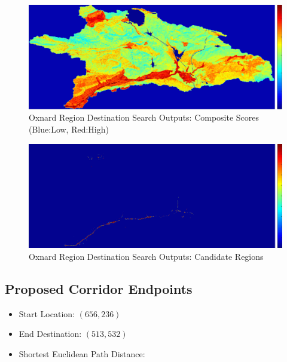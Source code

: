         \begin{figure}[!h]
            \begin{center}
            \includegraphics[width=5.5in]{figures/Oxnard_Search_Composite.png}   
            \caption{Oxnard Region Destination Search Outputs: Composite Scores (Blue:Low, Red:High)}
            \label{fig:Odsoutputs_comp}
            \end{center}
        \end{figure}
        
        \begin{figure}[!h]
            \begin{center}
            \includegraphics[width=5.5in]{figures/Oxnard_Search_Output.png}   
            \caption{Oxnard Region Destination Search Outputs: Candidate Regions}
            \label{fig:Odsoutputs_cand}
            \end{center}
        \end{figure}

    \subsection{Proposed Corridor Endpoints}
    
    \begin{itemize}
      \setlength{\itemsep}{0cm}
      \setlength{\parskip}{0cm}
        \item Start Location: $(656,236)$
        \item End Destination: $(513,532)$
        \item Shortest Euclidean Path Distance: 
    \end{itemize}
    
